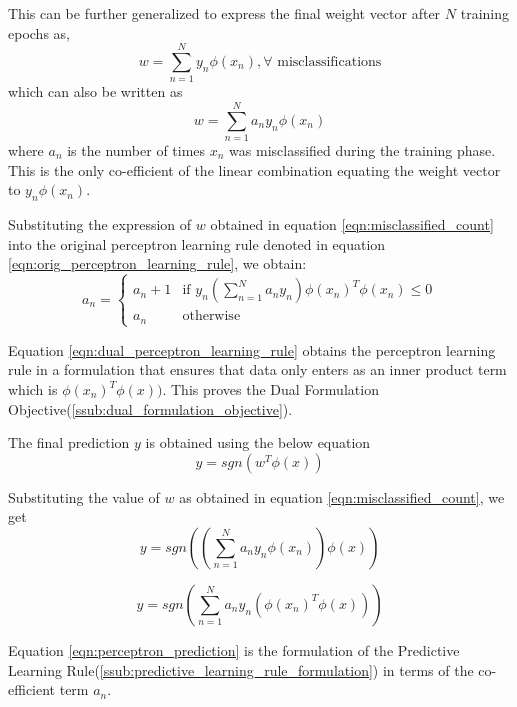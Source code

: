 \documentclass[parskip=full]{scrartcl}
\begin{document}
        This can be further generalized to express the final weight vector after $N$ training epochs as,
        $$w = \sum_{n=1}^N y_n \phi(x_n), \forall \text{ misclassifications}$$
        which can also be written as
        \begin{equation} \label{eqn:misclassified_count}
            w = \sum_{n=1}^N a_n y_n \phi(x_n)
        \end{equation}
        where $a_n$ is the number of times $x_n$ was misclassified during the training phase. This is the only co-efficient of the linear combination equating the weight vector to $y_n \phi(x_n)$.


        Substituting the expression of $w$ obtained in equation \ref{eqn:misclassified_count} into the original perceptron learning rule denoted in equation \ref{eqn:orig_perceptron_learning_rule}, we obtain:
        \begin{equation} \label{eqn:dual_perceptron_learning_rule}
            \boxed{
                a_n = 
                \begin{cases}
                    a_n + 1 & \text{if } y_n (\sum_{n=1}^N a_n y_n) \phi(x_n)^T\phi(x_n) \leq 0 \\
                    a_n     & \text{otherwise}
                \end{cases}
            }
        \end{equation}

        Equation \ref{eqn:dual_perceptron_learning_rule} obtains the perceptron learning rule in a formulation that ensures that data only enters as an inner product term which is $\phi(x_n)^T \phi(x))$. This proves the Dual Formulation Objective(\ref{ssub:dual_formulation_objective}).


        The final prediction $y$ is obtained using the below equation
        $$y = sgn(w^T \phi(x)) $$

        Substituting the value of $w$ as obtained in equation \ref{eqn:misclassified_count}, we get
        $$y = sgn((\sum_{n=1}^N a_n y_n \phi(x_n)) \phi(x)) $$

        \begin{equation} \label{eqn:perceptron_prediction}
            \boxed{
                y = sgn(\sum_{n=1}^N a_n y_n (\phi(x_n)^T \phi(x)))            
            }
        \end{equation}

        Equation \ref{eqn:perceptron_prediction} is the formulation of the Predictive Learning Rule(\ref{ssub:predictive_learning_rule_formulation}) in terms of the co-efficient term $a_n$.
    
\end{document}
